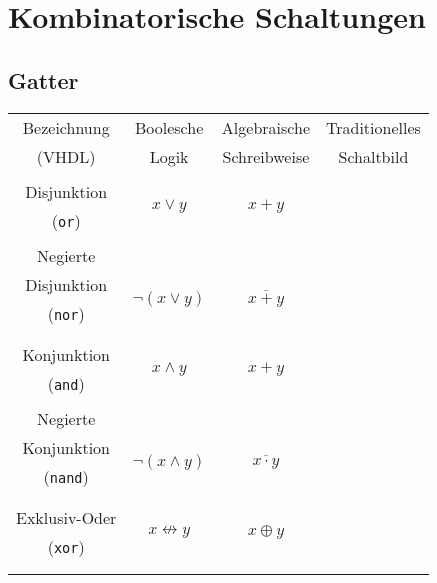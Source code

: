\documentclass[german, 10pt, a4paper, twocolumn]{scrartcl}
\theoremstyle{definition}
\begin{document}
\section{Kombinatorische Schaltungen}

\subsection{Gatter}

\small
\begin{tabular}{cccc}
	Bezeichnung &		Boolesche &				Algebraische &				Traditionelles \\
	(VHDL) &		Logik &					Schreibweise &				Schaltbild\\
	&			&					&					\multirow{3}{14mm}{\box\graph}\\
	Disjunktion &		\multirow{2}{14mm}{$x\lor y$}&		\multirow{2}{14mm}{$x+y$} &		\\
	(\texttt{or}) \\
	\\
	Negierte&		&					&					\multirow{3}{14mm}{\box\graph}\\
	Disjunktion &		\multirow{2}{14mm}{$\lnot(x\lor y)$}&	\multirow{2}{14mm}{$\overline{x+y}$} &	\\
	(\texttt{nor}) \\
	\\
	&			&					&					\multirow{3}{14mm}{\box\graph}\\
	Konjunktion &		\multirow{2}{14mm}{$x\land y$}&		\multirow{2}{14mm}{$x+y$} &	\\
	(\texttt{and}) \\
	\\
	Negierte&			&					&					\multirow{3}{14mm}{\box\graph}\\
	Konjunktion &		\multirow{2}{14mm}{$\lnot(x\land y)$}&	\multirow{2}{14mm}{$\overline{x\cdotp y}$} &	\\
	(\texttt{nand}) \\
	\\
	&			&					&					\multirow{3}{14mm}{\box\graph}\\
	Exklusiv-Oder &		\multirow{2}{14mm}{$x \not \leftrightarrow y$}&	\multirow{2}{14mm}{$x\oplus y$} &	\\
	(\texttt{xor}) \\
	\\
	&			&					&					\multirow{3}{14mm}{\box\graph}\\

\end{tabular}
\end{document}
